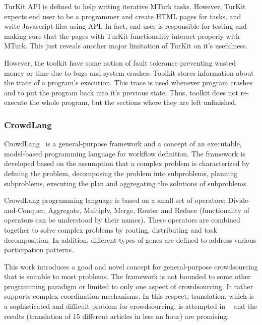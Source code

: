 TurKit API is defined to help writing iterative MTurk tasks. However, TurKit expects 
end user to be a programmer and create HTML pages for tasks, and write 
Javascript files using API. In fact, end user is responsible for testing and making 
sure that the pages with TurKit functionality interact properly with MTurk. 
This just reveals another major limitation of TurKit on it's usefulness.

However, the toolkit have some notion of fault tolerance preventing wasted 
money or time due to bugs and system crashes. Toolkit stores information about 
the trace of a program's execution. This trace is used whenever program crashes 
and to put the program back into it's previous state. Thus, toolkit does not 
re-execute the whole program, but the sections where they are left unfinished.


\subsubsection{CrowdLang}
CrowdLang~\cite{Minder2011} is a general-purpose framework and a concept of 
an executable, model-based programming language for workflow definition. The 
framework is developed based on the assumption that a complex problem is 
characterized by defining the problem, decomposing the problem into subproblems, 
planning subproblems, executing the plan and aggregating the solutions of subproblems.

CrowdLang programming language is based on a small set of operators: 
Divide-and-Conquer, Aggregate, Multiply, Merge, Router and Reduce 
(functionality of operators can be understood by their names). These operators 
are combined together to solve complex problems by routing, distributing and 
task decomposition. In addition, different types of genes are defined to address 
various participation patterns.

This work introduces a good and novel concept for general-purpose crowdsourcing 
that is suitable to most problems. The framework is not bounded to some other 
programming paradigm or limited to only one aspect of crowdsourcing. It rather 
supports complex coordination mechanisms. In this respect, translation, which is a 
sophisticated and difficult problem for crowdsourcing, is attempted in ~\cite{Minder2012} 
and the results (translation of 15 different articles in less an hour) are promising.

